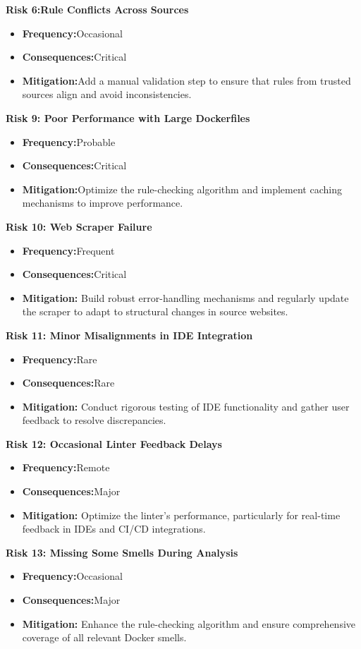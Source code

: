 \textbf{Risk 6:Rule Conflicts Across Sources }
\begin{itemize}
    \item \textbf{Frequency:}Occasional 
    \item \textbf{Consequences:}Critical 
    \item \textbf{Mitigation:}Add a manual validation step to ensure that rules from trusted sources align and avoid inconsistencies.
\end{itemize}
\textbf{Risk 9: Poor Performance with Large Dockerfiles}
\begin{itemize}
    \item \textbf{Frequency:}Probable
    \item \textbf{Consequences:}Critical 
    \item \textbf{Mitigation:}Optimize the rule-checking algorithm and implement caching mechanisms to improve performance.
\end{itemize}
\textbf{Risk 10: Web Scraper Failure}
\begin{itemize}
    \item \textbf{Frequency:}Frequent
    \item \textbf{Consequences:}Critical 
    \item \textbf{Mitigation:} Build robust error-handling mechanisms and regularly update the scraper to adapt to structural changes in source websites.
\end{itemize}
\textbf{Risk 11: Minor Misalignments in IDE Integration}
\begin{itemize}
    \item \textbf{Frequency:}Rare
    \item \textbf{Consequences:}Rare
    \item \textbf{Mitigation:} Conduct rigorous testing of IDE functionality and gather user feedback to resolve discrepancies.
\end{itemize}
\textbf{Risk 12: Occasional Linter Feedback Delays}
\begin{itemize}
    \item \textbf{Frequency:}Remote
    \item \textbf{Consequences:}Major
    \item \textbf{Mitigation:} Optimize the linter’s performance, particularly for real-time feedback in IDEs and CI/CD integrations.
\end{itemize}
\textbf{Risk 13: Missing Some Smells During Analysis}
\begin{itemize}
    \item \textbf{Frequency:}Occasional
    \item \textbf{Consequences:}Major
    \item \textbf{Mitigation:} Enhance the rule-checking algorithm and ensure comprehensive coverage of all relevant Docker smells.
\end{itemize}
